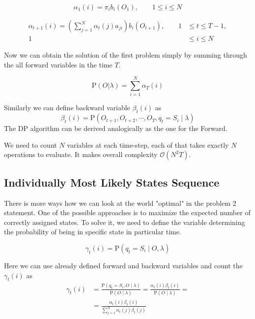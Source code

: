 \documentclass[thesis=M,english]{FITthesis}[2012/10/20]
\begin{document}
\begin{equation}
\alpha_1(i) = \pi_i b_i(O_1), \qquad 1 \leq i \leq N
\end{equation}

\begin{equation}
\begin{aligned}
\alpha_{t+1}(i) = \left( \sum_{j=1}^N \alpha_t(j) a_{ji} \right) b_i(O_{t+1}), \qquad 1& \leq t \leq T - 1, \\ 
                                                                                 1& \leq i \leq N		\end{aligned}
\end{equation}

Now we can obtain the solution of the first problem simply by summing through the all forward variables in the time $T$.

\begin{equation}
\mathrm{P}(O|\lambda) = \sum_{i=1}^N \alpha_T(i)
\end{equation} 

Similarly we can define backward variable $\beta_t(i)$ as
\begin{equation}
\beta_t(i) = \mathrm{P}(O_{t+1},O_{t+2},\cdots,O_T,q_t = S_i \mid \lambda ) 
\end{equation}
The DP algorithm can be derived analogically as the one for the Forward.

We need to count $N$ variables at each time-step, each of that takes exactly $N$ operations to evaluate. It makes overall complexity $\mathcal{O}(N^2T)$.    

\subsection{Individually Most Likely States Sequence}
There is more ways how we can look at the world "optimal" in the problem 2 statement. One of the possible approaches is to maximize the expected number of correctly assigned states. To solve it, we need to define the variable determining the probability of being in specific state in particular time.

\begin{equation}
\gamma_t(i) = \mathrm{P}(q_t = S_i \mid O,\lambda ) 
\end{equation}

Here we can use already defined forward and backward variables and count the $\gamma_t(i)$ as
\begin{equation}
\begin{aligned}
\gamma_t(i) &= \frac{ \mathrm{P}( q_t = S_i, O \mid \lambda )}{ \mathrm{P}( O \mid \lambda )} =
               \frac{  \alpha_t(i) \beta_t(i) }{ \mathrm{P}( O \mid \lambda )} = \\
            &= \frac{  \alpha_t(i) \beta_t(i) }{ \sum\limits_{j=1}^N \alpha_t(j) \beta_t(j) } 
\end{aligned}
\end{equation}
\end{document}
